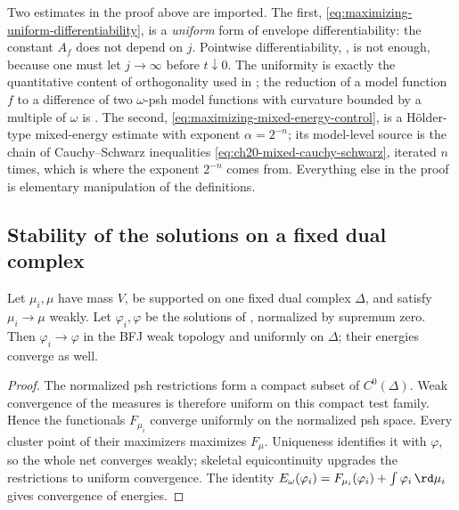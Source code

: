 \begin{remark}
\label{rem:ch28-stability-quoted}
Two estimates in the proof above are imported.  The first,
\eqref{eq:maximizing-uniform-differentiability}, is a \emph{uniform} form of
envelope differentiability: the constant $A_f$ does not depend on $j$.
Pointwise differentiability, ,
is not enough, because one must let $j\to\infty$ before $t\downarrow0$.
The uniformity is exactly the quantitative content of orthogonality used in
\cite{BJ25FiniteEnergy}; the reduction of a model function $f$ to a
difference of two $\omega$-psh model functions with curvature bounded by a
multiple of $\omega$ is .  The
second, \eqref{eq:maximizing-mixed-energy-control}, is a Hölder-type
mixed-energy estimate with exponent $\alpha=2^{-n}$; its model-level source
is the chain of Cauchy--Schwarz inequalities
\eqref{eq:ch20-mixed-cauchy-schwarz}, iterated $n$ times, which is where
the exponent $2^{-n}$ comes from.  Everything else in the proof is
elementary manipulation of the definitions.
\end{remark}

\subsection{Stability of the solutions on a fixed dual complex}
\label{sec:ch28-fixed-skeleton}

\begin{proposition}
\label{prop:fixed-skeleton-stability}
Let $\mu_i,\mu$ have mass $V$, be supported on one fixed dual complex
$\Delta$, and satisfy $\mu_i\to\mu$ weakly.  Let $\varphi_i,\varphi$
be the solutions of , normalized by
supremum zero.  Then $\varphi_i\to\varphi$ in the BFJ weak topology and
uniformly on $\Delta$; their energies converge as well.
\end{proposition}

\begin{proof}
The normalized psh restrictions form a compact subset of $C^0(\Delta)$.
Weak convergence of the measures is therefore uniform on this compact test
family.  Hence the functionals $F_{\mu_i}$ converge uniformly on the
normalized psh space.  Every cluster point of their maximizers maximizes
$F_\mu$.  Uniqueness identifies it with $\varphi$, so the whole net
converges weakly; skeletal equicontinuity upgrades the restrictions to
uniform convergence.  The identity
$E_\omega(\varphi_i)=F_{\mu_i}(\varphi_i)+
\int\varphi_i\,\rd \mu_i$ gives convergence of energies.
\end{proof}

